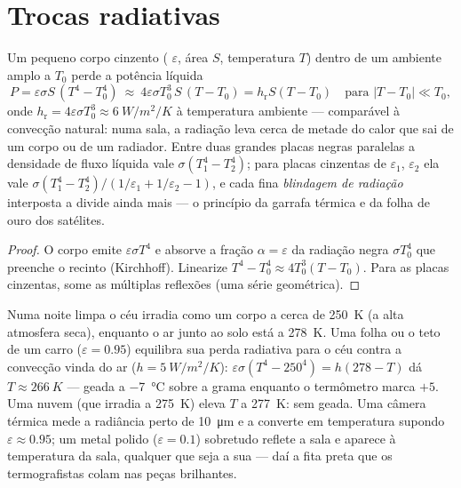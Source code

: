 \section{Trocas radiativas}

\begin{proposition}\label{prop:b2:thermal-radiation:exchange}
Um pequeno corpo cinzento ( $\varepsilon$, área $S$, temperatura $T$)
dentro de um ambiente amplo a $T_0$ perde a potência líquida
\[
P = \varepsilon\sigma S\,(T^4 - T_0^4)
\ \approx\ 4\varepsilon\sigma T_0^3\,S\,(T - T_0) = h_{\text{r}}S(T - T_0)
\quad\text{para } |T - T_0| \ll T_0 ,
\]
onde $h_{\text{r}} = 4\varepsilon\sigma T_0^3 \approx \qty{6}{W/m^2/K}$ à
temperatura ambiente --- comparável à convecção natural: numa sala, a
radiação leva cerca de metade do calor que sai de um corpo ou de um radiador.
Entre duas grandes placas negras paralelas a densidade de fluxo líquida vale
$\sigma(T_1^4 - T_2^4)$; para placas cinzentas de  $\varepsilon_1$,
$\varepsilon_2$ ela vale $\sigma(T_1^4 - T_2^4)/(1/\varepsilon_1 + 1/\varepsilon_2
- 1)$, e cada fina \emph{blindagem de radiação} interposta a divide
ainda mais --- o princípio da garrafa térmica e da folha de ouro dos
satélites.
\end{proposition}

\begin{proof}
O corpo emite $\varepsilon\sigma T^4$ e absorve a fração $\alpha =
\varepsilon$ da radiação negra $\sigma T_0^4$ que preenche o recinto
(Kirchhoff). Linearize $T^4 - T_0^4 \approx 4T_0^3(T - T_0)$. Para as
placas cinzentas, some as múltiplas reflexões (uma série geométrica).
\end{proof}

\begin{example}\label{ex:b2:thermal-radiation:frost}
Numa noite limpa o céu irradia como um corpo a cerca de \qty{250}{K}
(a alta atmosfera seca), enquanto o ar junto ao solo está a
\qty{278}{K}. Uma folha ou o teto de um carro ($\varepsilon = 0.95$) equilibra sua
perda radiativa para o céu contra a convecção vinda do ar ($h =
\qty{5}{W/m^2/K}$): $\varepsilon\sigma(T^4 - 250^4) = h(278 - T)$ dá $T
\approx \qty{266}{K}$ --- geada a \qty{-7}{\celsius} sobre a grama enquanto
o termômetro marca $+5$. Uma nuvem (que irradia a \qty{275}{K}) eleva $T$
a \qty{277}{K}: sem geada. Uma câmera térmica mede a radiância perto de
\qty{10}{\micro m} e a converte em temperatura supondo
$\varepsilon \approx 0.95$; um metal polido ($\varepsilon = 0.1$) sobretudo
reflete a sala e aparece à temperatura da sala, qualquer que seja a
sua --- daí a fita preta que os termografistas colam nas peças brilhantes.
\end{example}


